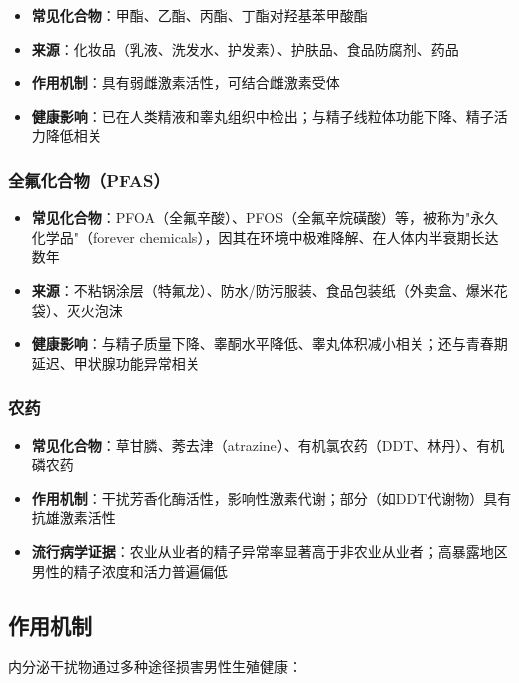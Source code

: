 \begin{itemize}[leftmargin=2cm]
	\item \textbf{常见化合物}：甲酯、乙酯、丙酯、丁酯对羟基苯甲酸酯
	\item \textbf{来源}：化妆品（乳液、洗发水、护发素）、护肤品、食品防腐剂、药品
	\item \textbf{作用机制}：具有弱雌激素活性，可结合雌激素受体
	\item \textbf{健康影响}：已在人类精液和睾丸组织中检出；与精子线粒体功能下降、精子活力降低相关
\end{itemize}

\subsubsection{全氟化合物（PFAS）}

\begin{itemize}[leftmargin=2cm]
	\item \textbf{常见化合物}：PFOA（全氟辛酸）、PFOS（全氟辛烷磺酸）等，被称为"永久化学品"（forever chemicals），因其在环境中极难降解、在人体内半衰期长达数年
	\item \textbf{来源}：不粘锅涂层（特氟龙）、防水/防污服装、食品包装纸（外卖盒、爆米花袋）、灭火泡沫
	\item \textbf{健康影响}：与精子质量下降、睾酮水平降低、睾丸体积减小相关；还与青春期延迟、甲状腺功能异常相关
\end{itemize}

\subsubsection{农药}

\begin{itemize}[leftmargin=2cm]
	\item \textbf{常见化合物}：草甘膦、莠去津（atrazine）、有机氯农药（DDT、林丹）、有机磷农药
	\item \textbf{作用机制}：干扰芳香化酶活性，影响性激素代谢；部分（如DDT代谢物）具有抗雄激素活性
	\item \textbf{流行病学证据}：农业从业者的精子异常率显著高于非农业从业者；高暴露地区男性的精子浓度和活力普遍偏低
\end{itemize}

\subsection{作用机制}

内分泌干扰物通过多种途径损害男性生殖健康：

